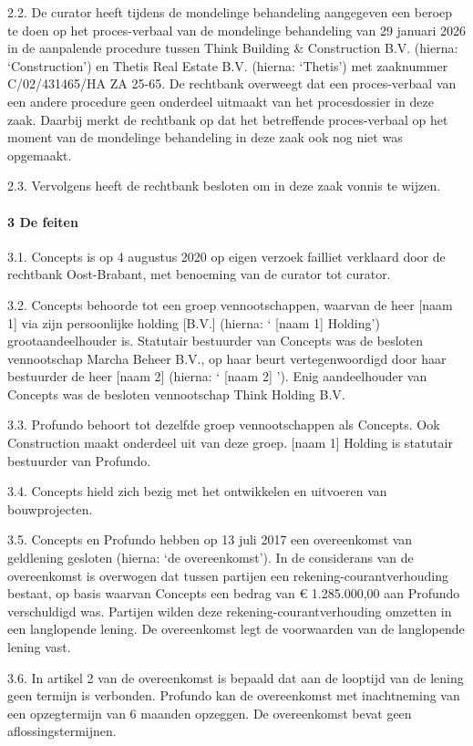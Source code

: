 \documentclass[
  dutch,
  a4paper,
]{article}
\begin{document}
2.2. De curator heeft tijdens de mondelinge behandeling aangegeven een beroep te doen op het proces-verbaal van de mondelinge behandeling van 29 januari 2026 in de aanpalende procedure tussen Think Building \& Construction B.V. (hierna: `Construction') en Thetis Real Estate B.V. (hierna: `Thetis') met zaaknummer C/02/431465/HA ZA 25-65. De rechtbank overweegt dat een proces-verbaal van een andere procedure geen onderdeel uitmaakt van het procesdossier in deze zaak. Daarbij merkt de rechtbank op dat het betreffende proces-verbaal op het moment van de mondelinge behandeling in deze zaak ook nog niet was opgemaakt.

2.3. Vervolgens heeft de rechtbank besloten om in deze zaak vonnis te wijzen.

\paragraph{3 De feiten}\label{de-feiten-1}

3.1. Concepts is op 4 augustus 2020 op eigen verzoek failliet verklaard door de rechtbank Oost-Brabant, met benoeming van de curator tot curator.

3.2. Concepts behoorde tot een groep vennootschappen, waarvan de heer {[}naam 1{]} via zijn persoonlijke holding {[}B.V.{]} (hierna: ` {[}naam 1{]} Holding') grootaandeelhouder is. Statutair bestuurder van Concepts was de besloten vennootschap Marcha Beheer B.V., op haar beurt vertegenwoordigd door haar bestuurder de heer {[}naam 2{]} (hierna: ` {[}naam 2{]} '). Enig aandeelhouder van Concepts was de besloten vennootschap Think Holding B.V.

3.3. Profundo behoort tot dezelfde groep vennootschappen als Concepts. Ook Construction maakt onderdeel uit van deze groep. {[}naam 1{]} Holding is statutair bestuurder van Profundo.

3.4. Concepts hield zich bezig met het ontwikkelen en uitvoeren van bouwprojecten.

3.5. Concepts en Profundo hebben op 13 juli 2017 een overeenkomst van geldlening gesloten (hierna: `de overeenkomst'). In de considerans van de overeenkomst is overwogen dat tussen partijen een rekening-courantverhouding bestaat, op basis waarvan Concepts een bedrag van € 1.285.000,00 aan Profundo verschuldigd was. Partijen wilden deze rekening-courantverhouding omzetten in een langlopende lening. De overeenkomst legt de voorwaarden van de langlopende lening vast.

3.6. In artikel 2 van de overeenkomst is bepaald dat aan de looptijd van de lening geen termijn is verbonden. Profundo kan de overeenkomst met inachtneming van een opzegtermijn van 6 maanden opzeggen. De overeenkomst bevat geen aflossingstermijnen.
\end{document}
